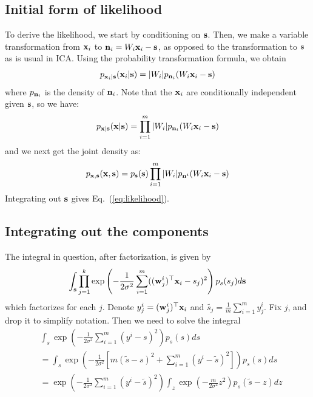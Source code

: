 \documentclass{report}
\begin{document}
\subsection{Initial form of likelihood}\label{sec:appendix:likelihood_transform}

To derive the likelihood, we start by conditioning on $\mathbf{s}$. Then, we make a variable transformation from $\mathbf{x}_i$ to $\mathbf{n}_i=W_i\mathbf{x}_i-\mathbf{s}$, as opposed to the transformation to $\mathbf{s}$ as is usual in ICA. Using the probability transformation formula, we obtain
\begin{equation}
p_{\mathbf{x}_i|\mathbf{s}}(\mathbf{x}_i|\mathbf{s})=|W_i|p_{\mathbf{n}_i}(W_i\mathbf{x}_i-\mathbf{s})    
\end{equation}
where $p_{\mathbf{n}_i}$ is the density of $\mathbf{n}_i$. Note that the $\mathbf{x}_i$ are conditionally independent given $\mathbf{s}$, so we have:
\begin{equation}
  p_{\mathbf{x}|\mathbf{s}}(\mathbf{x}|\mathbf{s})=\prod_{i=1}^m  |W_i| p_{\mathbf{n}_i}(W_i\mathbf{x}_i-\mathbf{s})
\end{equation}
and we next get the joint density as:
\begin{equation}
  p_{\mathbf{x}, \mathbf{s}}(\mathbf{x},\mathbf{s})=p_{\mathbf{s}}(\mathbf{s}) \prod_{i=1}^m  |W_i| p_{\mathbf{n}^i}(W_i\mathbf{x}_i-\mathbf{s})
\end{equation}
Integrating out $\mathbf{s}$ gives Eq.~(\ref{eq:likelihood}).


\subsection{Integrating out the components}\label{sec:appendix:integration}

The integral in question, after factorization, is given by
\begin{equation}
\int_{\mathbf{s}} \prod_{j=1}^k \exp \left( -\frac{1}{2\sigma^2} \sum_{i=1}^m ((\mathbf{w}_j^i)^{\top}\mathbf{x}_i-s_j)^2 \right) p_{s}(s_j) d\mathbf{s}
\end{equation}
which factorizes for each $j$. Denote $y^i_j=(\mathbf{w}_j^i)^{\top}\mathbf{x}_i$ and $\tilde{s_j}=\frac1m\sum_{i=1}^m y^i_j$.  Fix $j$, and drop it to simplify notation. Then we need to solve the integral
\begin{align*}
   &\int_s \exp \left(-\frac{1}{2\sigma^2} \sum_{i=1}^m (y^i-s)^2 \right) p_{s}(s)ds\\
   &=\int_s \exp \left(-\frac{1}{2\sigma^2} [ m(\tilde{s}-s)^2 + \sum_{i=1}^m (y^i-\tilde{s})^2] \right) p_{s}(s)ds \\ 
&= \exp \left(-\frac{1}{2\sigma^2}\sum_{i=1}^m (y^i-\tilde{s})^2 \right) 
\int_z \exp \left(-\frac{m}{2\sigma^2} z^2 \right) p_{s}(\tilde{s}-z) dz
\end{align*}
\end{document}
